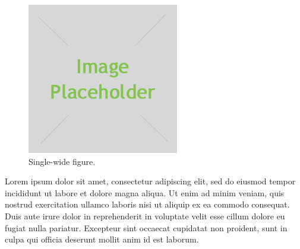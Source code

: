 \documentclass[10pt,twocolumn,letterpaper]{article}
\begin{document}
\begin{figure}[t]
    \centering
    \includegraphics[width=\linewidth]{placeholder.jpg}
    \caption{Single-wide figure.}
    \label{fig:result1}
\end{figure}

Lorem ipsum dolor sit amet, consectetur adipiscing elit, sed do eiusmod tempor incididunt ut labore et dolore magna aliqua. Ut enim ad minim veniam, quis nostrud exercitation ullamco laboris nisi ut aliquip ex ea commodo consequat. Duis aute irure dolor in reprehenderit in voluptate velit esse cillum dolore eu fugiat nulla pariatur. Excepteur sint occaecat cupidatat non proident, sunt in culpa qui officia deserunt mollit anim id est laborum.
\end{document}
